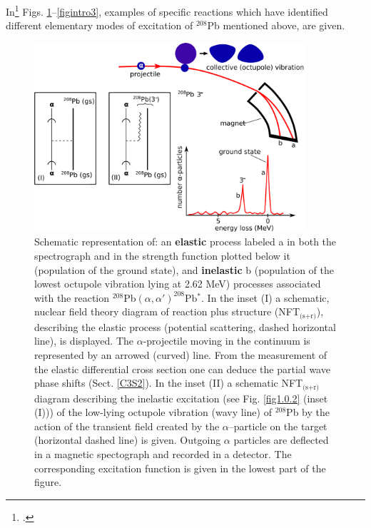 In\footnote{\cite{Mottelson:76b}.} Figs. \ref{figintro1}--\ref{figintro3}, examples of specific reactions which have identified different elementary modes of excitation of $^{208}$Pb mentioned above, are given.
\begin{figure}
\centerline {
\includegraphics*[width=10cm]{introduccion/figs/figintro1}
}
\caption[Elastic and $^{208}$Pb$(\alpha,\alpha')^{208}$Pb$^*$ inelastic scattering.]{Schematic representation of: an \textbf{elastic} process labeled a in both the spectrograph and in the strength function plotted below it (population of the ground state), and \textbf{inelastic} b (population of the lowest octupole vibration lying at 2.62 MeV) processes associated with the reaction $^{208}$Pb$(\alpha,\alpha')^{208}$Pb$^*$.  In the inset (I) a schematic, nuclear field theory diagram of reaction plus structure (NFT$_{\text{(s+r)}}$), describing  the elastic process (potential scattering, dashed horizontal line), is displayed. The $\alpha$-projectile moving in the continuum is represented by an arrowed (curved) line. From the measurement of the elastic differential cross section one can deduce the partial wave phase shifts (Sect. \ref{C3S2}). In the inset (II) a schematic NFT$_{\text{(s+r)}}$ diagram describing the inelastic  excitation (see Fig.  \ref{fig1.0.2} (inset (I))) of the low-lying octupole vibration (wavy line) of $^{208}$Pb by the action of the transient field created by the $\alpha$--particle on the target (horizontal dashed line) is given.  Outgoing $\alpha$ particles are deflected in a magnetic spectograph and recorded in a detector. The corresponding excitation function is given in the lowest part of the figure.}
\label{figintro1}
\end{figure}
